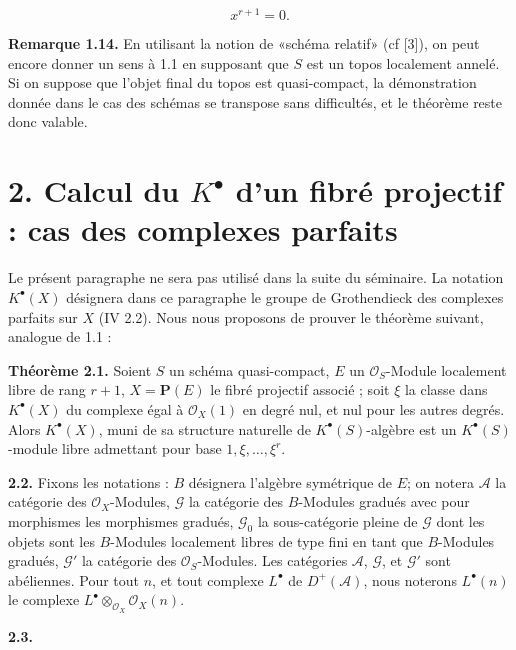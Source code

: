 \begin{equation}\tag{1.13.2}
  x^{r+1}=0.
\end{equation}

\textbf{Remarque 1.14.} En utilisant la notion de «schéma relatif» (cf [3]), on peut encore donner un sens à 1.1 en supposant que \(S\) est un topos localement annelé. Si on suppose que l'objet final du topos est quasi-compact, la démonstration donnée dans le cas des schémas se transpose sans difficultés, et le théorème reste donc valable.

\section*{2. Calcul du \(K^{\bullet}\) d'un fibré projectif : cas des complexes parfaits}


Le présent paragraphe ne sera pas utilisé dans la suite du séminaire. La notation \(K^{\bullet}(X)\) désignera dans ce paragraphe le groupe de Grothendieck des complexes parfaits sur \(X\) (IV 2.2). Nous nous proposons de prouver le théorème suivant, analogue de 1.1 :

\textbf{Théorème 2.1.} Soient \(S\) un schéma quasi-compact, \(E\) un \(\mathcal O_S\)-Module localement libre de rang \(r+1\), \(X=\mathbf P(E)\) le fibré projectif associé ; soit \(\xi\) la classe dans \(K^{\bullet}(X)\) du complexe égal à \(\mathcal O_X(1)\) en degré nul, et nul pour les autres degrés. Alors \(K^{\bullet}(X)\), muni de sa structure naturelle de \(K^{\bullet}(S)\)-algèbre est un \(K^{\bullet}(S)\)-module libre admettant pour base \(1,\xi,\ldots,\xi^r\).

\textbf{2.2.} Fixons les notations : \(B\) désignera l'algèbre symétrique de \(E\); on notera \(\mathcal A\) la catégorie des \(\mathcal O_X\)-Modules, \(\mathcal G\) la catégorie des \(B\)-Modules gradués avec pour morphismes les morphismes gradués, \(\mathcal G_0\) la sous-catégorie pleine de \(\mathcal G\) dont les objets sont les \(B\)-Modules localement libres de type fini en tant que \(B\)-Modules gradués, \(\mathcal G'\) la catégorie des \(\mathcal O_S\)-Modules. Les catégories \(\mathcal A\), \(\mathcal G\), et \(\mathcal G'\) sont abéliennes. Pour tout \(n\), et tout complexe \(L^\bullet\) de \(D^+(\mathcal A)\), nous noterons \(L^\bullet(n)\) le complexe \(L^\bullet\otimes_{\mathcal O_X}\mathcal O_X(n)\).

\textbf{2.3.}
